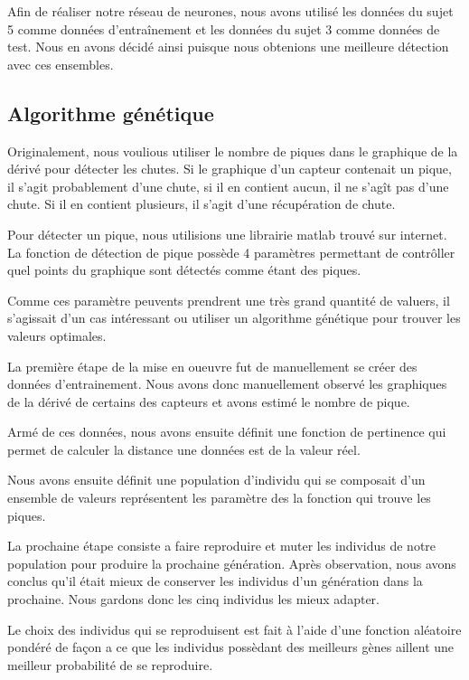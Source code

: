 \documentclass[12pt,letterpaper]{article}
\begin{document}
Afin de réaliser notre réseau de neurones, nous avons utilisé les données du sujet 5 comme données d'entraînement et les données du sujet 3 comme données de test. Nous en avons décidé ainsi puisque nous obtenions une meilleure détection avec ces ensembles. 

\subsection{Algorithme génétique}

Originalement, nous voulious utiliser le nombre de piques dans le graphique de la dérivé pour détecter les chutes.
Si le graphique d'un capteur contenait un pique, il s'agit probablement d'une chute, si il en contient aucun, il 
ne s'agît pas d'une chute. Si il en contient plusieurs, il s'agit d'une récupération de chute. 

Pour détecter un pique, nous utilisions une librairie matlab trouvé sur internet. La fonction de détection de pique
possède 4 paramètres permettant de contrôller quel points du graphique sont détectés comme étant des piques. 

Comme ces paramètre peuvents prendrent une très grand quantité de valuers, il s'agissait d'un cas intéressant ou utiliser
un algorithme génétique pour trouver les valeurs optimales. 

La première étape de la mise en oueuvre fut de manuellement se créer des données d'entrainement. Nous avons donc manuellement
observé les graphiques de la dérivé de certains des capteurs et avons estimé le nombre de pique. 

Armé de ces données, nous avons ensuite définit une fonction de pertinence qui permet de calculer la distance une données est de 
la valeur réel. 

Nous avons ensuite définit une population d'individu qui se composait d'un ensemble de valeurs représentent les paramètre des la
fonction qui trouve les piques. 

La prochaine étape consiste a faire reproduire et muter les individus de notre population pour produire la prochaine génération. Après 
observation, nous avons conclus qu'il était mieux de conserver les individus d'un génération dans la prochaine. Nous gardons donc les 
cinq individus les mieux adapter. 

Le choix des individus qui se reproduisent est fait à l'aide d'une fonction aléatoire pondéré de façon a ce que les individus possèdant
des meilleurs gènes aillent une meilleur probabilité de se reproduire. 
\end{document}

